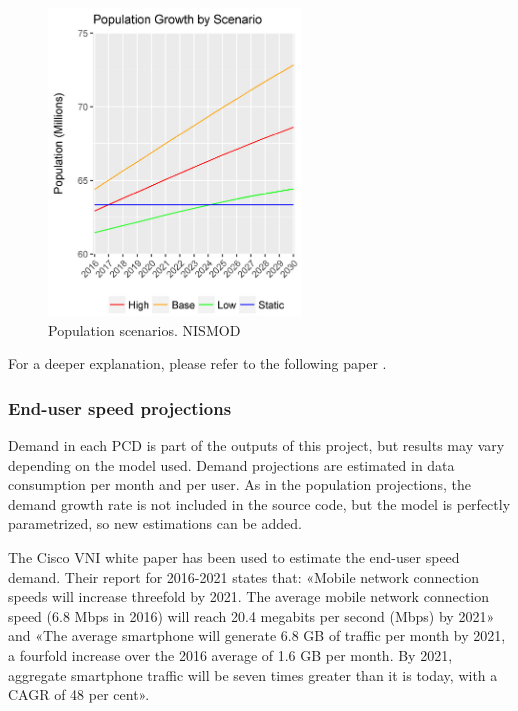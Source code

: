 
\begin{figure}[H]
	\begin{Center}
		\includegraphics[width=0.60\textwidth]{./media/image19.png}
		\caption{Population scenarios. NISMOD\cite{3-07}}
	\end{Center}
\end{figure}
For a deeper explanation, please refer to the following paper \cite{3-03}.

\subsubsection*{End-user speed projections}
Demand in each PCD is part of the outputs of this project, but results may vary depending on the model used. Demand projections are estimated in data consumption per month and per user. As in the population projections, the demand growth rate is not included in the source code, but the model is perfectly parametrized, so new estimations can be added. \par

The Cisco VNI white paper \cite{3-08} has been used to estimate the end-user speed demand. Their report for 2016-2021 states that: «Mobile network connection speeds will increase threefold by 2021. The average mobile network connection speed (6.8 Mbps in 2016) will reach 20.4 megabits per second (Mbps) by 2021» and «The average smartphone will generate 6.8 GB of traffic per month by 2021, a fourfold increase over the 2016 average of 1.6 GB per month. By 2021, aggregate smartphone traffic will be seven times greater than it is today, with a CAGR of 48 per cent».




